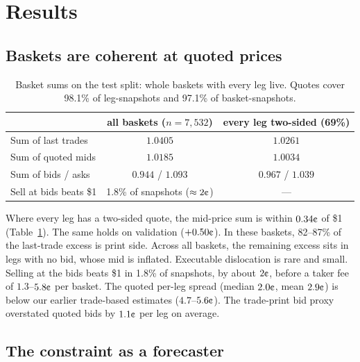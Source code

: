 \documentclass[11pt,a4paper]{article}
\newcommand{\cent}{\text{\textcent}}
\begin{document}
\section{Results}

\subsection{Baskets are coherent at quoted prices}\label{sec:coherence}

\begin{table}[h]
\centering
\caption{Basket sums on the test split: whole baskets with every leg live.
Quotes cover 98.1\% of leg-snapshots and 97.1\% of basket-snapshots.}
\label{tab:coherence}
\begin{tabular}{lcc}
\toprule
 & all baskets ($n=7{,}532$) & every leg two-sided (69\%) \\
\midrule
Sum of last trades & $1.0405$ & $1.0261$ \\
Sum of quoted mids & $1.0185$ & $\bm{1.0034}$ \\
Sum of bids / asks & $0.944$ / $1.093$ & $0.967$ / $1.039$ \\
Sell at bids beats \$1 & 1.8\% of snapshots ($\approx 2\cent$) & --- \\
\bottomrule
\end{tabular}
\end{table}

Where every leg has a two-sided quote, the mid-price sum is within $0.34\cent$
of \$1 (Table~\ref{tab:coherence}). The same holds on validation ($+0.50\cent$).
In these baskets, 82--87\% of the last-trade excess is print side. Across all
baskets, the remaining excess sits in legs with no bid, whose mid is inflated.
Executable dislocation is rare and small. Selling at the bids beats \$1 in 1.8\%
of snapshots, by about $2\cent$, before a taker fee of $1.3$--$5.8\cent$ per
basket. The quoted per-leg spread (median $2.0\cent$, mean $2.9\cent$) is below
our earlier trade-based estimates ($4.7$--$5.6\cent$). The trade-print bid proxy
overstated quoted bids by $1.1\cent$ per leg on average.

\subsection{The constraint as a forecaster}\label{sec:constraint}
\end{document}
